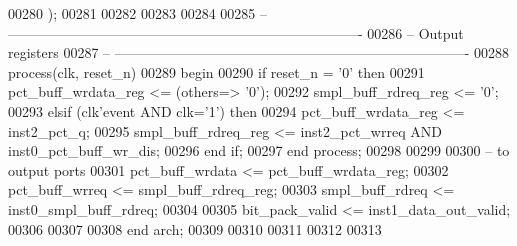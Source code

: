 \begin{DoxyCode}
00280         \textcolor{vhdlchar}{)};
00281 
00282 
00283 
00284 
00285 \textcolor{keyword}{-- ----------------------------------------------------------------------------}
00286 \textcolor{keyword}{-- Output registers}
00287 \textcolor{keyword}{-- ----------------------------------------------------------------------------       }
00288 \textcolor{keywordflow}{process}(clk, reset_n)
00289 \textcolor{vhdlkeyword}{begin}
00290    \textcolor{keywordflow}{if} \textcolor{vhdlchar}{reset_n} \textcolor{vhdlchar}{=} \textcolor{vhdlchar}{'}\textcolor{vhdllogic}{}\textcolor{vhdllogic}{0}\textcolor{vhdlchar}{'} \textcolor{keywordflow}{then} 
00291       \textcolor{vhdlchar}{pct_buff_wrdata_reg} \textcolor{vhdlchar}{<=} \textcolor{vhdlchar}{(}\textcolor{keywordflow}{others}\textcolor{vhdlchar}{=}\textcolor{vhdlchar}{>} \textcolor{vhdlchar}{'}\textcolor{vhdllogic}{}\textcolor{vhdllogic}{0}\textcolor{vhdlchar}{'}\textcolor{vhdlchar}{)};
00292       \textcolor{vhdlchar}{smpl_buff_rdreq_reg} \textcolor{vhdlchar}{<=} \textcolor{vhdlchar}{'}\textcolor{vhdllogic}{}\textcolor{vhdllogic}{0}\textcolor{vhdlchar}{'};
00293    \textcolor{keywordflow}{elsif} \textcolor{vhdlchar}{(}\textcolor{vhdlchar}{clk}\textcolor{vhdlchar}{'}\textcolor{vhdlkeyword}{event} \textcolor{keywordflow}{AND} \textcolor{vhdlchar}{clk}\textcolor{vhdlchar}{=}\textcolor{vhdlchar}{'}\textcolor{vhdllogic}{}\textcolor{vhdllogic}{1}\textcolor{vhdlchar}{'}\textcolor{vhdlchar}{)} \textcolor{keywordflow}{then} 
00294       \textcolor{vhdlchar}{pct_buff_wrdata_reg} \textcolor{vhdlchar}{<=} \textcolor{vhdlchar}{inst2_pct_q};
00295       \textcolor{vhdlchar}{smpl_buff_rdreq_reg} \textcolor{vhdlchar}{<=} \textcolor{vhdlchar}{inst2_pct_wrreq} \textcolor{keywordflow}{AND} \textcolor{vhdlchar}{inst0_pct_buff_wr_dis}; 
00296    \textcolor{keywordflow}{end} \textcolor{keywordflow}{if};
00297 \textcolor{keywordflow}{end} \textcolor{keywordflow}{process};
00298  
00299 
00300 \textcolor{keyword}{-- to output ports }
00301 \textcolor{vhdlchar}{pct_buff_wrdata}   \textcolor{vhdlchar}{<=} \textcolor{vhdlchar}{pct_buff_wrdata_reg};  
00302 \textcolor{vhdlchar}{pct_buff_wrreq}    \textcolor{vhdlchar}{<=} \textcolor{vhdlchar}{smpl_buff_rdreq_reg};
00303 \textcolor{vhdlchar}{smpl_buff_rdreq}   \textcolor{vhdlchar}{<=} \textcolor{vhdlchar}{inst0_smpl_buff_rdreq};
00304      
00305 \textcolor{vhdlchar}{bit_pack_valid} \textcolor{vhdlchar}{<=} \textcolor{vhdlchar}{inst1_data_out_valid};
00306 
00307   
00308 \textcolor{keywordflow}{end} \textcolor{vhdlchar}{arch};   
00309 
00310 
00311 
00312 
00313 
\end{DoxyCode}
